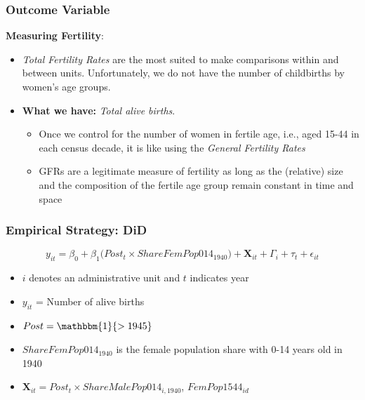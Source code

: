 \documentclass[aspectratio=169]{beamer}
\begin{document}
\begin{frame}
\frametitle{Outcome Variable}
\label{empirical}
\textbf{Measuring Fertility}:
\medskip
\begin{itemize}
    \item \textit{Total Fertility Rates} are the most suited to make comparisons within and between units. Unfortunately, we do not have the number of childbirths by women's age groups. 
    \medskip
    \item \textbf{What we have:} \textit{Total alive births}. 
    \begin{itemize}

\medskip 
    \item Once we control for the number of women in fertile age, i.e., aged 15-44 in each census decade, it is like using the \textit{General Fertility Rates}  
    \medskip
    \item GFRs are a legitimate measure of fertility as long as the  (relative) size and the composition of the fertile age group remain constant in time and space \hyperlink{stability_age}{}

    \end{itemize}

    \medskip
    
\end{itemize}

\end{frame} 
\begin{frame}[label=empirical_reg]
\frametitle{Empirical Strategy: DiD}
 
 \begin{equation}\label{main_eq}
y_{it} =\beta_0+  \beta_1   \big( \textit{Post}_t \times ShareFemPop014_{1940}\big)+\mathbf{X}_{it}+\Gamma_i+ \tau_{t}+\epsilon_{it}
\end{equation}
\smallskip
\begin{itemize}
\item  $i$  denotes an administrative unit and $t$  indicates year
\medskip
\item $y_{it}$ = Number of alive births 
\medskip
\item $Post= \mathbbm{1} \{> 1945\}$ 
\medskip

\item $ShareFemPop014_{1940}$ is the female population share with 0-14 years old in 1940
\medskip


\item $\mathbf{X}_{it} = Post_t \times ShareMalePop014_{i,1940}$, $FemPop1544_{id}$

\end{itemize}

\medskip

\hyperlink{map_together}{} \hyperlink{balancing}{} \hyperlink{descriptives}{} 

 
\end{frame}
\end{document}
